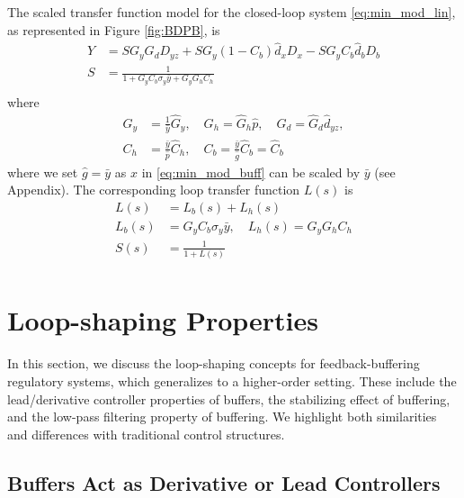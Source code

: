 \documentclass[letterpaper, 10 pt,  conference]{ieeeconf}  %
\begin{document}
The scaled transfer function model for the closed-loop system \eqref{eq:min_mod_lin}, as represented in Figure \ref{fig:BDPB}, is
\begin{equation}\label{eq:sf}
\begin{aligned}
Y&=S G_y  G_d D_{yz}+S G_y(1-C_b)\hat d_xD_x-S G_yC_b\hat d_bD_b\\
S&=\frac{1}{1+ G_yC_b \sigma_y\bar{y}+ G_yG_hC_h}\\
\end{aligned} 
\end{equation}
where 
\begin{equation*}
\begin{aligned}
G_y&=\frac{1}{\bar{y}}\hat G_y,\quad G_h= \hat G_h\hat{p},\quad  G_d= \hat{G}_d\hat d_{yz},\\
 C_h&=\frac{\bar{y}}{\hat{p}}\hat C_h,\quad C_b =\frac{\bar{y}}{\hat{g}}\hat C_b=\hat C_b
\end{aligned} 
\end{equation*}
where we set $\hat{g}=\bar{y}$ as $x$ in \eqref{eq:min_mod_buff} can be scaled by $\bar{y}$ (see Appendix). The corresponding loop transfer function $L(s)$ \cite{SKOP05} is
\begin{equation}\label{eq:ltf}
\begin{aligned}
L(s)&=L_b(s)+L_h(s) \\
L_b(s)&= G_yC_b \sigma_y\bar{y},\quad L_h(s)= G_yG_hC_h\\
S(s)&=\frac{1}{1+L(s)}\\
\end{aligned}
\end{equation}


\section{Loop-shaping Properties}\label{sect:loop}

In this section, we discuss the loop-shaping concepts for feedback-buffering regulatory systems, which generalizes \cite{HANAPS17} to a higher-order setting. These include the lead/derivative controller properties of buffers, the stabilizing effect of buffering, and the low-pass filtering property of buffering. We highlight both similarities and differences with traditional control structures.

\subsection{Buffers Act as Derivative or Lead Controllers}
\end{document}
